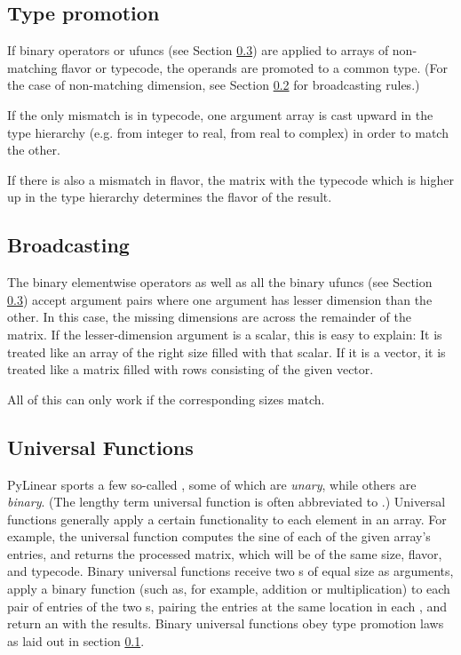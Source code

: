 \subsection{Type promotion}
\label{subsec:arraypromotion}

If binary operators or ufuncs (see Section \ref{subsec:ufuncs})
are applied to arrays of non-matching flavor or typecode,
the operands are promoted to a common type. (For the case of
non-matching dimension, see Section \ref{subsec:arraybroadcast}
for broadcasting rules.)

If the only mismatch is in typecode, one argument array
is cast upward in the type hierarchy (e.g. from integer to real,
from real to complex) in order to match the other.

If there is also a mismatch in flavor, the matrix with the typecode
which is higher up in the type hierarchy determines the flavor of the
result.

\subsection{Broadcasting}
\label{subsec:arraybroadcast}

The binary elementwise operators as well as all the binary ufuncs (see
Section \ref{subsec:ufuncs}) accept argument pairs where one argument
has lesser dimension than the other. In this case, the missing dimensions
are  across the remainder of the
matrix. If the lesser-dimension argument is a scalar, this is easy to
explain: It is treated like an array of the right size filled with
that scalar. If it is a vector, it is treated like a matrix filled
with rows consisting of the given vector.

All of this can only work if the corresponding  sizes 
match.

\subsection{Universal Functions}
\label{subsec:ufuncs}

PyLinear sports a few so-called ,
 some of which are \emph{unary},
while others are \emph{binary}. (The lengthy term universal function is
often abbreviated to .) Universal functions
generally apply a certain functionality to each element in an
array. For example, the  universal function computes the
sine of each of the given array's entries, and returns the processed
matrix, which will be of the same size, flavor, and typecode. Binary
universal functions receive two s of equal size as
arguments, apply a binary function (such as, for example, addition or
multiplication) to each pair of entries of the two s,
pairing the entries at the same location in each , and
return an  with the results. Binary universal functions
obey type promotion laws as laid out in section
\ref{subsec:arraypromotion}.

